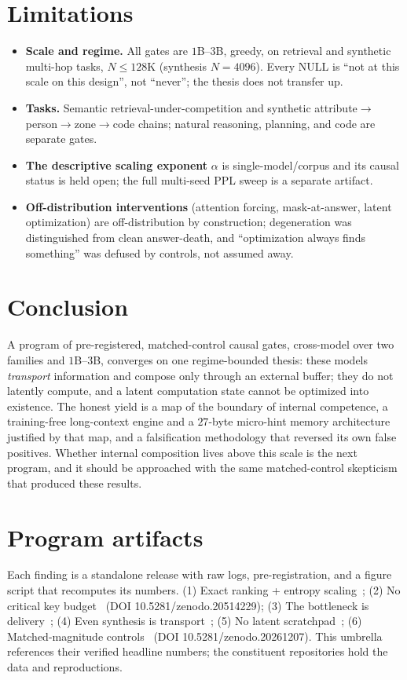 \documentclass[11pt]{article}
\begin{document}
\section{Limitations}
\label{sec:limits}

\begin{itemize}
\item \textbf{Scale and regime.} All gates are $1$B--$3$B, greedy, on retrieval and
synthetic multi-hop tasks, $N\le128$K (synthesis $N{=}4096$). Every NULL is
``not at this scale on this design'', not ``never''; the thesis does not transfer up.
\item \textbf{Tasks.} Semantic retrieval-under-competition and synthetic
attribute$\to$person$\to$zone$\to$code chains; natural reasoning, planning, and code are
separate gates.
\item \textbf{The descriptive scaling exponent} $\alpha$ is single-model/corpus and its
causal status is held open; the full multi-seed PPL sweep is a separate artifact.
\item \textbf{Off-distribution interventions} (attention forcing, mask-at-answer, latent
optimization) are off-distribution by construction; degeneration was distinguished from
clean answer-death, and ``optimization always finds something'' was defused by controls,
not assumed away.
\end{itemize}

\section{Conclusion}
\label{sec:conc}

A program of pre-registered, matched-control causal gates, cross-model over two
families and $1$B--$3$B, converges on one regime-bounded thesis: these models
\emph{transport} information and compose only through an external buffer; they do not
latently compute, and a latent computation state cannot be optimized into existence.
The honest yield is a map of the boundary of internal competence, a training-free
long-context engine and a $27$-byte micro-hint memory architecture justified by that
map, and a falsification methodology that reversed its own false positives. Whether
internal composition lives above this scale is the next program, and it should be
approached with the same matched-control skepticism that produced these results.

\section*{Program artifacts}
Each finding is a standalone release with raw logs, pre-registration, and a figure
script that recomputes its numbers. (1) Exact ranking + entropy scaling~\cite{paper2qaxis};
(2) No critical key budget~\cite{paper3retention} (DOI 10.5281/zenodo.20514229);
(3) The bottleneck is delivery~\cite{paper4arc};
(4) Even synthesis is transport~\cite{paper5synth};
(5) No latent scratchpad~\cite{paper6latent};
(6) Matched-magnitude controls~\cite{matchedcontrols2026} (DOI 10.5281/zenodo.20261207).
This umbrella references their verified headline numbers; the constituent repositories
hold the data and reproductions.
\end{document}
